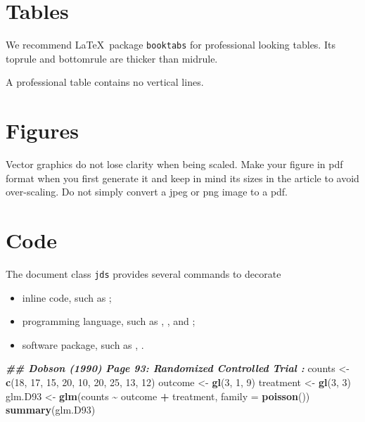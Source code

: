 \documentclass[letterpaper,inpress]{jdsart}
\newenvironment{Shaded}{\begin{snugshade}}{\end{snugshade}}
\newcommand{\AttributeTok}[1]{\textcolor[rgb]{0.13,0.29,0.53}{#1}}
\newcommand{\DecValTok}[1]{\textcolor[rgb]{0.00,0.00,0.81}{#1}}
\newcommand{\DocumentationTok}[1]{\textcolor[rgb]{0.56,0.35,0.01}{\textbf{\textit{#1}}}}
\newcommand{\FunctionTok}[1]{\textcolor[rgb]{0.13,0.29,0.53}{\textbf{#1}}}
\newcommand{\NormalTok}[1]{#1}
\newcommand{\OtherTok}[1]{\textcolor[rgb]{0.56,0.35,0.01}{#1}}
\newcommand{\SpecialCharTok}[1]{\textcolor[rgb]{0.81,0.36,0.00}{\textbf{#1}}}
\begin{document}
\newpage

\hypertarget{tables}{%
\section{Tables}\label{tables}}

We recommend \LaTeX~package \texttt{booktabs} for professional
looking tables. Its toprule and bottomrule are thicker than midrule.

A professional table contains no vertical lines.

\hypertarget{figures}{%
\section{Figures}\label{figures}}

Vector graphics do not lose clarity when being scaled. Make your
figure in pdf format when you first generate it and keep in mind its
sizes in the article to avoid over-scaling. Do not simply convert a
jpeg or png image to a pdf.

\hypertarget{code}{%
\section{Code}\label{code}}

The document class \texttt{jds} provides several commands to decorate

\begin{itemize}
\item inline code, such as ;
\item programming language, such as , , and
  ;
\item software package, such as , .
\end{itemize}

\begin{Shaded}
\begin{Highlighting}[]
\DocumentationTok{\#\# Dobson (1990) Page 93: Randomized Controlled Trial :}
\NormalTok{counts }\OtherTok{\textless{}{-}} \FunctionTok{c}\NormalTok{(}\DecValTok{18}\NormalTok{, }\DecValTok{17}\NormalTok{, }\DecValTok{15}\NormalTok{, }\DecValTok{20}\NormalTok{, }\DecValTok{10}\NormalTok{, }\DecValTok{20}\NormalTok{, }\DecValTok{25}\NormalTok{, }\DecValTok{13}\NormalTok{, }\DecValTok{12}\NormalTok{)}
\NormalTok{outcome }\OtherTok{\textless{}{-}} \FunctionTok{gl}\NormalTok{(}\DecValTok{3}\NormalTok{, }\DecValTok{1}\NormalTok{, }\DecValTok{9}\NormalTok{)}
\NormalTok{treatment }\OtherTok{\textless{}{-}} \FunctionTok{gl}\NormalTok{(}\DecValTok{3}\NormalTok{, }\DecValTok{3}\NormalTok{)}
\NormalTok{glm.D93 }\OtherTok{\textless{}{-}} \FunctionTok{glm}\NormalTok{(counts }\SpecialCharTok{\textasciitilde{}}\NormalTok{ outcome }\SpecialCharTok{+}\NormalTok{ treatment, }\AttributeTok{family =} \FunctionTok{poisson}\NormalTok{())}
\FunctionTok{summary}\NormalTok{(glm.D93)}
\end{Highlighting}
\end{Shaded}
\end{document}
